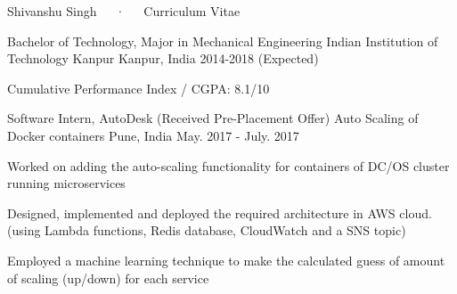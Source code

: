 \documentclass[11pt, a4paper]{cv}
\begin{document}
\makecvheader

\makecvfooter
  {}
  {Shivanshu Singh~~~·~~~Curriculum Vitae}
  {\thepage}


\begin{cventries}

  \cventry
    {Bachelor of Technology, Major in Mechanical Engineering} %
    {Indian Institution of Technology Kanpur} %
    {Kanpur, India} %
        {2014-2018 (Expected)} %
    {
      \begin{cvitems} %
        \item {Cumulative Performance Index / CGPA: 8.1/10}
      \end{cvitems}
    }

\end{cventries}



\begin{cventries}

  \cventry
    {Software Intern, AutoDesk (Received Pre-Placement Offer)} %
    {Auto Scaling of Docker containers} %
    {Pune, India} %
    {May. 2017 - July. 2017} %
    {
      \begin{cvitems} %
        \item {Worked on adding the auto-scaling functionality for containers of DC/OS cluster running microservices}
        \item {Designed, implemented and deployed the required architecture in AWS cloud. (using Lambda functions, Redis database, CloudWatch and a SNS topic)}
        \item {Employed a machine learning technique to make the calculated guess of amount of scaling (up/down) for each service}
      \end{cvitems}
    }

\end{cventries}

\end{document}
